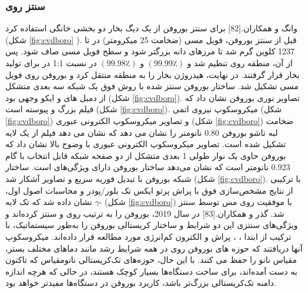 \subsubsection{سنتز روی }
وانگ و همکاران.\cite{taiSynthesisAtomicallyThin2015}[82] برای سنتز بوروفن از یک دیگ بخار دو بخشی  خانگی استفاده کرد (شکل \ref{fig:cvdboro} ). قبل از سنتز بوروفن، فویل مسی (ضخامت 25 میکرومتر) در  تا 1237 کلوین گرم شد تا مرزهای دانه بزرگتر شود و سطح فویل مسی صاف شود. پس از آن، منطقه  روی  تنظیم شد و  $(99.99٪)$ و  $(99.98٪)$ در نسبت 1:1 در  برای تولید بخار  قرار گرفتند. در نهایت، هیدروژن بخار  را به منطقه  منتقل کرد و بوروفن روی فویل مسی تشکیل شد. ساختار بوروفن سنتز شده با روش فوق یک شبکه سه بعدی متشکل از دمبل های  و  ایکو وجهی بود (شکل \ref{fig:cvdboro}). تصاویر نوری بوروفن نشان داد که فیلم بزرگ و پیوسته است (شکل \ref{fig:cvdboro}). میکروسکوپ نیروی اتمی  (شکل \ref{fig:cvdboro}) و تصاویر میکروسکوپ الکترونی عبوری  (شکل \ref{fig:cvdboro}) ضخامت لبه تاشو بوروفن 0.80 نانومتر را نشان می دهد که نشان می دهد فیلم از یک لایه تشکیل شده است. تصاویر میکروسکوپ الکترونی عبوری با وضوح بالا  نشان داد که بوروفن حاوی یک نوار طولی 1 بعدی متشکل از دو صفحه شبکه قابل انتخاب با گام 0.923 نانومتر است که نشان می‌دهد ساختار بوروفن دارای ویژگی‌های  است. ساختار شبکه بوروفن با تبدیل فوریه سریع  و تصاویر  آشکار شد (شکل \ref{fig:cvdboro}). با ترکیبی از نتایج مشخص‌سازی فوق با پراش پرتو ایکس تک بلور/پودر و محاسبات اصول اول، نشان داده شد که تک لایه $\gamma$- (شکل \ref{fig:cvdboro}) با موفقیت روی مس توسط  سنتز شد. گذر و همکاران.\cite{wuLargeareaSinglecrystalSheets2019}[83] در سال 2019، بوروفن را به ترتیب روی  و  سنتز کرده‌اند و ویژگی‌های سنتزی این دو شرایط و ساختار کریستالی بوروفن را به‌طور سیستماتیک، با ترکیب از ابتدا ، ، پراش و الکترون کم‌انرژی مورد مطالعه قرار داده‌اند. میکروسکوپ آنها دریافتند که حوزه های بوروفن روی  در همه شرایط رشد مانند دماهای مختلف بستر، مقیاس نانو را حفظ می کنند. با این حال، حوزه‌های تک‌کریستالی نانومقیاس که تاکنون به دست آمده‌اند، برای ساخت دستگاه‌ها بسیار کوچک هستند، در حالی که هرچه اندازه دامنه تک‌کریستالی بزرگ‌تر باشد، کاربرد بوروفن در دستگاه‌ها مفیدتر خواهد بود.

